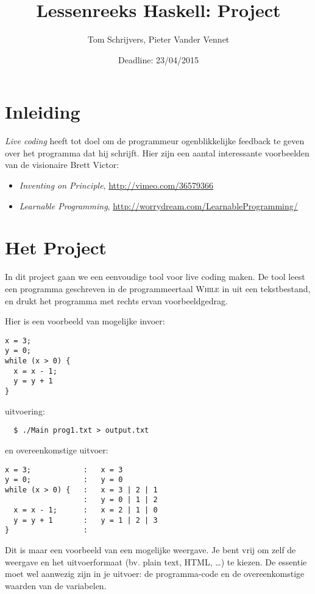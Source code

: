 \documentclass{article}
\title{Lessenreeks Haskell: Project}
\date{Deadline: 23/04/2015}
\author{Tom Schrijvers, Pieter Vander Vennet}
\begin{document}
\maketitle

\section{Inleiding}

\emph{Live coding} heeft tot doel om de programmeur ogenblikkelijke feedback te
geven over het programma dat hij schrijft. Hier zijn een aantal interessante
voorbeelden van de visionaire Brett Victor:
\begin{itemize}
\item \emph{Inventing on Principle}, \url{http://vimeo.com/36579366}
\item \emph{Learnable Programming}, \url{http://worrydream.com/LearnableProgramming/}
\end{itemize}

\section{Het Project}
In dit project gaan we een eenvoudige tool voor live coding maken.
De tool leest een programma geschreven in de programmeertaal \textsc{While} in
uit een tekstbestand, en drukt het programma met rechts ervan voorbeeldgedrag.

Hier is een voorbeeld van mogelijke invoer:
\begin{Verbatim}[frame=single,framesep=5mm,label={prog1.txt}]
x = 3;
y = 0;
while (x > 0) {
  x = x - 1;
  y = y + 1
}
\end{Verbatim}
uitvoering:
\begin{Verbatim}
  $ ./Main prog1.txt > output.txt
\end{Verbatim}
en overeenkomstige uitvoer:
\begin{Verbatim}[frame=single,framesep=5mm,label={output.txt}]
x = 3;            :   x = 3
y = 0;            :   y = 0
while (x > 0) {   :   x = 3 | 2 | 1
                  :   y = 0 | 1 | 2
  x = x - 1;      :   x = 2 | 1 | 0
  y = y + 1       :   y = 1 | 2 | 3
}                 :
\end{Verbatim}

Dit is maar een voorbeeld van een mogelijke weergave. Je bent vrij om zelf de
weergave en het uitvoerformaat (bv. plain text, HTML, \ldots) te kiezen.
De essentie moet wel aanwezig zijn in je uitvoer: de programma-code en
de overeenkomstige waarden van de variabelen.
\end{document}

